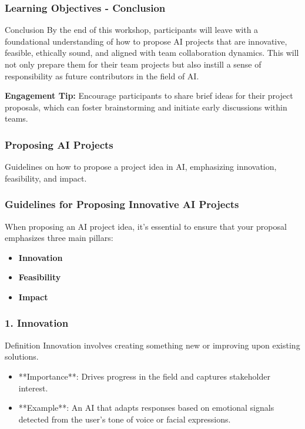 \documentclass[aspectratio=169]{beamer}
\begin{document}
\begin{frame}[fragile]
    \frametitle{Learning Objectives - Conclusion}
    \begin{block}{Conclusion}
        By the end of this workshop, participants will leave with a foundational understanding of how to propose AI projects that are innovative, feasible, ethically sound, and aligned with team collaboration dynamics. This will not only prepare them for their team projects but also instill a sense of responsibility as future contributors in the field of AI.
    \end{block}
    \textbf{Engagement Tip:} Encourage participants to share brief ideas for their project proposals, which can foster brainstorming and initiate early discussions within teams.
\end{frame}

\begin{frame}[fragile]
    \frametitle{Proposing AI Projects}
    Guidelines on how to propose a project idea in AI, emphasizing innovation, feasibility, and impact.
\end{frame}

\begin{frame}[fragile]
    \frametitle{Guidelines for Proposing Innovative AI Projects}
    When proposing an AI project idea, it’s essential to ensure that your proposal emphasizes three main pillars:
    \begin{itemize}
        \item \textbf{Innovation}
        \item \textbf{Feasibility}
        \item \textbf{Impact}
    \end{itemize}
\end{frame}

\begin{frame}[fragile]
    \frametitle{1. Innovation}
    \begin{block}{Definition}
        Innovation involves creating something new or improving upon existing solutions.
    \end{block}
    \begin{itemize}
        \item **Importance**: Drives progress in the field and captures stakeholder interest.
        \item **Example**: An AI that adapts responses based on emotional signals detected from the user’s tone of voice or facial expressions.
    \end{itemize}
\end{frame}
\end{document}
